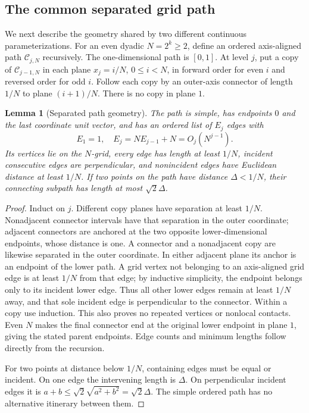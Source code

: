 \documentclass[11pt,letterpaper]{article}
\newtheorem{lemma}[theorem]{Lemma}
\theoremstyle{definition}\newtheorem{definition}[theorem]{Definition}
\theoremstyle{remark}\newtheorem{remark}[theorem]{Remark}
\begin{document}
\subsection{The common separated grid path}
We next describe the geometry shared by two different continuous parameterizations. For an even dyadic $N=2^k\ge2$, define an ordered axis-aligned path $\mathcal C_{j,N}$ recursively. The one-dimensional path is $[0,1]$. At level $j$, put a copy of $\mathcal C_{j-1,N}$ in each plane $x_j=i/N$, $0\le i<N$, in forward order for even $i$ and reversed order for odd $i$. Follow each copy by an outer-axis connector of length $1/N$ to plane $(i+1)/N$. There is no copy in plane $1$.

\begin{lemma}[Separated path geometry]\label{lem:snakegeometry}
The path is simple, has endpoints $0$ and the last coordinate unit vector, and has an ordered list of $E_j$ edges with
\[
 E_1=1,\quad E_j=NE_{j-1}+N=O_j(N^{j-1}).
\]
Its vertices lie on the $N$-grid, every edge has length at least $1/N$, incident consecutive edges are perpendicular, and nonincident edges have Euclidean distance at least $1/N$. If two points on the path have distance $\Delta<1/N$, their connecting subpath has length at most $\sqrt2\Delta$.
\end{lemma}
\begin{proof}
Induct on $j$. Different copy planes have separation at least $1/N$. Nonadjacent connector intervals have that separation in the outer coordinate; adjacent connectors are anchored at the two opposite lower-dimensional endpoints, whose distance is one. A connector and a nonadjacent copy are likewise separated in the outer coordinate. In either adjacent plane its anchor is an endpoint of the lower path. A grid vertex not belonging to an axis-aligned grid edge is at least $1/N$ from that edge; by inductive simplicity, the endpoint belongs only to its incident lower edge. Thus all other lower edges remain at least $1/N$ away, and that sole incident edge is perpendicular to the connector. Within a copy use induction. This also proves no repeated vertices or nonlocal contacts. Even $N$ makes the final connector end at the original lower endpoint in plane $1$, giving the stated parent endpoints. Edge counts and minimum lengths follow directly from the recursion.

For two points at distance below $1/N$, containing edges must be equal or incident. On one edge the intervening length is $\Delta$. On perpendicular incident edges it is $a+b\le\sqrt2\sqrt{a^2+b^2}=\sqrt2\Delta$. The simple ordered path has no alternative itinerary between them.
\end{proof}
\end{document}
